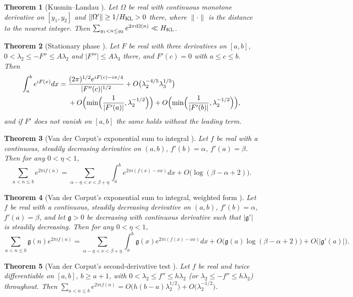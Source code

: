 \documentclass[preprint,12pt]{elsarticle}
\numberwithin{equation}{section}
\theoremstyle{plain}
\newtheorem{theorem}{Theorem}[section]
\theoremstyle{definition}
\theoremstyle{remark}
\begin{document}
\begin{theorem}[Kusmin--Landau {\cite[Thm.~2.1]{GrahamKolesnik1991}}]\label{thm:known_KL}
Let $\Omega$ be real with continuous monotone derivative on $[y_1,y_2]$ and $\|\Omega'\|\ge1/H_{\rm KL}>0$ there, where $\|\cdot\|$ is the distance to the nearest integer. Then $\sum_{y_1<n\le y_2}e^{2\pi i\Omega(n)}\ll H_{\rm KL}$.
\end{theorem}

\begin{theorem}[Stationary phase {\cite[Lemma~4.6]{Titchmarsh1986}}]\label{thm:known_stationary}
Let $F$ be real with three derivatives on $[a,b]$, $0<\lambda_2\le-F''\le A\lambda_2$ and $|F'''|\le A\lambda_3$ there, and $F'(c)=0$ with $a\le c\le b$. Then
\begin{align*}
\int_a^be^{iF(x)}dx={}&\frac{(2\pi)^{1/2}e^{iF(c)-i\pi/4}}{|F''(c)|^{1/2}}+O\bigl(\lambda_2^{-4/5}\lambda_3^{1/5}\bigr)\\
&+O\Bigl(\min\Bigl(\frac1{|F'(a)|},\lambda_2^{-1/2}\Bigr)\Bigr)+O\Bigl(\min\Bigl(\frac1{|F'(b)|},\lambda_2^{-1/2}\Bigr)\Bigr),
\end{align*}
and if $F'$ does not vanish on $[a,b]$ the same holds without the leading term.
\end{theorem}

\begin{theorem}[Van der Corput's exponential sum to integral {\cite[Lemma~4.7]{Titchmarsh1986}}]\label{thm:known_vdC}
Let $f$ be real with a continuous, steadily decreasing derivative on $(a,b)$, $f'(b)=\alpha$, $f'(a)=\beta$. Then for any $0<\eta<1$,
\[
\sum_{a<n\le b}e^{2\pi if(n)}=\sum_{\alpha-\eta<\nu<\beta+\eta}\int_a^be^{2\pi i(f(x)-\nu x)}dx+O\bigl(\log(\beta-\alpha+2)\bigr).
\]
\end{theorem}

\begin{theorem}[Van der Corput's exponential sum to integral, weighted form {\cite[Lemma~4.10]{Titchmarsh1986}}]\label{thm:known_vdC_weighted}
Let $f$ be real with a continuous, steadily decreasing derivative on $(a,b)$, $f'(b)=\alpha$, $f'(a)=\beta$, and let $\mathfrak g>0$ be decreasing with continuous derivative such that $|\mathfrak g'|$ is steadily decreasing. Then for any $0<\eta<1$,
\[
\sum_{a<n\le b}\mathfrak g(n)e^{2\pi if(n)}=\sum_{\alpha-\eta<\nu<\beta+\eta}\int_a^b\mathfrak g(x)e^{2\pi i(f(x)-\nu x)}dx+O\bigl(\mathfrak g(a)\log(\beta-\alpha+2)\bigr)+O\bigl(|\mathfrak g'(a)|\bigr).
\]
\end{theorem}

\begin{theorem}[Van der Corput's second-derivative test {\cite[Thm.~5.9]{Titchmarsh1986}}]\label{thm:known_vdC2}
Let $f$ be real and twice differentiable on $[a,b]$, $b\ge a+1$, with $0<\lambda_2\le f''\le h\lambda_2$ (or $\lambda_2\le-f''\le h\lambda_2$) throughout. Then $\sum_{a<n\le b}e^{2\pi if(n)}=O\bigl(h(b-a)\lambda_2^{1/2}\bigr)+O\bigl(\lambda_2^{-1/2}\bigr)$.
\end{theorem}
\end{document}
